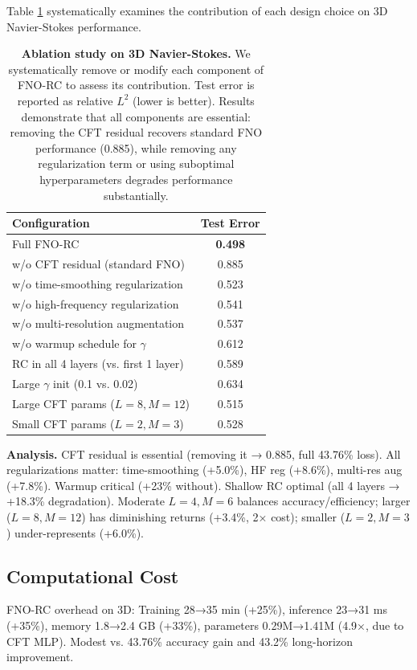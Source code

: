\documentclass[11pt]{article}
\begin{document}
Table \ref{tab:ablation} systematically examines the contribution of each design choice on 3D Navier-Stokes performance.

\begin{table}[h]
\centering
\caption{\textbf{Ablation study on 3D Navier-Stokes.} We systematically remove or modify each component of FNO-RC to assess its contribution. Test error is reported as relative $L^2$ (lower is better). Results demonstrate that all components are essential: removing the CFT residual recovers standard FNO performance (0.885), while removing any regularization term or using suboptimal hyperparameters degrades performance substantially.}
\label{tab:ablation}
\small
\begin{tabular}{@{}lc@{}}
\toprule
\textbf{Configuration} & \textbf{Test Error} \\
\midrule
Full FNO-RC & \textbf{0.498} \\
\midrule
w/o CFT residual (standard FNO) & 0.885 \\
w/o time-smoothing regularization & 0.523 \\
w/o high-frequency regularization & 0.541 \\
w/o multi-resolution augmentation & 0.537 \\
w/o warmup schedule for $\gamma$ & 0.612 \\
\midrule
RC in all 4 layers (vs. first 1 layer) & 0.589 \\
Large $\gamma$ init (0.1 vs. 0.02) & 0.634 \\
Large CFT params ($L=8, M=12$) & 0.515 \\
Small CFT params ($L=2, M=3$) & 0.528 \\
\bottomrule
\end{tabular}
\end{table}

\textbf{Analysis.} CFT residual is essential (removing it → 0.885, full 43.76\% loss). All regularizations matter: time-smoothing (+5.0\%), HF reg (+8.6\%), multi-res aug (+7.8\%). Warmup critical (+23\% without). Shallow RC optimal (all 4 layers → +18.3\% degradation). Moderate $L=4, M=6$ balances accuracy/efficiency; larger ($L=8, M=12$) has diminishing returns (+3.4\%, 2× cost); smaller ($L=2, M=3$) under-represents (+6.0\%).

\subsection{Computational Cost}

FNO-RC overhead on 3D: Training 28→35 min (+25\%), inference 23→31 ms (+35\%), memory 1.8→2.4 GB (+33\%), parameters 0.29M→1.41M (4.9×, due to CFT MLP). Modest vs. 43.76\% accuracy gain and 43.2\% long-horizon improvement.
\end{document}
